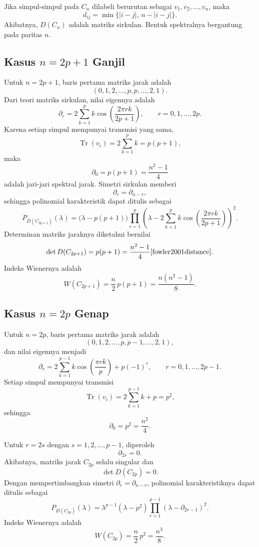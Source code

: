 \documentclass[12pt,a4paper]{article}
\begin{document}
Jika simpul-simpul pada $C_n$ dilabeli berurutan sebagai $v_1,v_2,\dots,v_n$, maka
\[
  d_{ij}=\min\{|i-j|,\, n-|i-j|\}.
\]
Akibatnya, $D(C_n)$ adalah matriks sirkulan. Bentuk spektralnya bergantung pada paritas $n$.

\subsection{Kasus $n=2p+1$ Ganjil}

Untuk $n=2p+1$, baris pertama matriks jarak adalah
\[
  (0,1,2,\dots,p,p,\dots,2,1).
\]
Dari teori matriks sirkulan, nilai eigennya adalah
\[
  \partial_r
  =
  2\sum_{k=1}^{p} k \cos\left(\frac{2\pi rk}{2p+1}\right),
  \qquad
  r=0,1,\dots,2p.
\]
Karena setiap simpul mempunyai transmisi yang sama,
\[
  \operatorname{Tr}(v_i)=2\sum_{k=1}^{p} k=p(p+1),
\]
maka
\[
  \partial_0=p(p+1)=\frac{n^2-1}{4}
\]
adalah jari-jari spektral jarak. Simetri sirkulan memberi
\[
  \partial_r=\partial_{n-r},
\]
sehingga polinomial karakteristik dapat ditulis sebagai
\[
  P_{D(C_{2p+1})}(\lambda)
  =
  \bigl(\lambda-p(p+1)\bigr)
  \prod_{r=1}^{p}
  \left(
  \lambda-2\sum_{k=1}^{p} k \cos\left(\frac{2\pi rk}{2p+1}\right)
  \right)^2.
\]
Determinan matriks jaraknya diketahui bernilai
\[
  \det D(C_{2p+1})=p(p+1)=\frac{n^2-1}{4} \cite{fowler2001distance}.
\]
Indeks Wienernya adalah
\[
  W(C_{2p+1})
  =\frac{n}{2}\,p(p+1)
  =\frac{n(n^2-1)}{8}.
\]

\subsection{Kasus $n=2p$ Genap}

Untuk $n=2p$, baris pertama matriks jarak adalah
\[
  (0,1,2,\dots,p,p-1,\dots,2,1),
\]
dan nilai eigennya menjadi
\[
  \partial_r
  =
  2\sum_{k=1}^{p-1} k \cos\left(\frac{\pi rk}{p}\right)+p(-1)^r,
  \qquad
  r=0,1,\dots,2p-1.
\]
Setiap simpul mempunyai transmisi
\[
  \operatorname{Tr}(v_i)=2\sum_{k=1}^{p-1}k+p=p^2,
\]
sehingga
\[
  \partial_0=p^2=\frac{n^2}{4}.
\]

Untuk $r=2s$ dengan $s=1,2,\dots,p-1$, diperoleh
\[
  \partial_{2s}=0.
\]
Akibatnya, matriks jarak $C_{2p}$ selalu singular dan
\[
  \det D(C_{2p})=0.
\]
Dengan mempertimbangkan simetri $\partial_r=\partial_{n-r}$, polinomial karakteristiknya dapat ditulis sebagai
\[
  P_{D(C_{2p})}(\lambda)
  =
  \lambda^{p-1}(\lambda-p^2)
  \prod_{r=1}^{p-1}(\lambda-\partial_{2r-1})^2.
\]
Indeks Wienernya adalah
\[
  W(C_{2p})=\frac{n}{2}\,p^2=\frac{n^3}{8}.
\]
\end{document}
